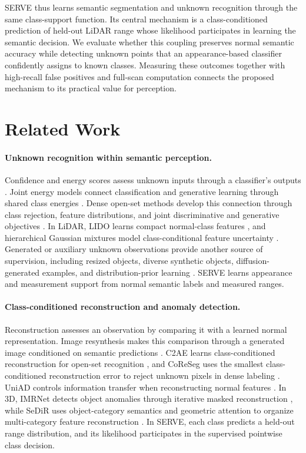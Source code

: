 \documentclass{article}
\begin{document}
SERVE thus learns semantic segmentation and unknown recognition through the same class-support function. Its central mechanism is a class-conditioned prediction of held-out LiDAR range whose likelihood participates in learning the semantic decision. We evaluate whether this coupling preserves normal semantic accuracy while detecting unknown points that an appearance-based classifier confidently assigns to known classes. Measuring these outcomes together with high-recall false positives and full-scan computation connects the proposed mechanism to its practical value for perception.

\section{Related Work}
\label{sec:related}
\paragraph{Unknown recognition within semantic perception.}
Confidence and energy scores assess unknown inputs through a classifier's outputs \citep{msp,energy}. Joint energy models connect classification and generative learning through shared class energies \citep{jem}. Dense open-set methods develop this connection through class rejection, feature distributions, and joint discriminative and generative objectives \citep{rba,pixood,densehybrid}. In LiDAR, LIDO learns compact normal-class features \citep{lido}, and hierarchical Gaussian mixtures model class-conditional feature uncertainty \citep{hgmm}. Generated or auxiliary unknown observations provide another source of supervision, including resized objects, diverse synthetic objects, diffusion-generated examples, and distribution-prior learning \citep{real,lion,doodle,ndp,rel}. SERVE learns appearance and measurement support from normal semantic labels and measured ranges.

\paragraph{Class-conditioned reconstruction and anomaly detection.}
Reconstruction assesses an observation by comparing it with a learned normal representation. Image resynthesis makes this comparison through a generated image conditioned on semantic predictions \citep{resynthesis}. C2AE learns class-conditioned reconstruction for open-set recognition \citep{c2ae}, and CoReSeg uses the smallest class-conditioned reconstruction error to reject unknown pixels in dense labeling \citep{coreseg}. UniAD controls information transfer when reconstructing normal features \citep{uniad}. In 3D, IMRNet detects object anomalies through iterative masked reconstruction \citep{imrnet}, while SeDiR uses object-category semantics and geometric attention to organize multi-category feature reconstruction \citep{sedir}. In SERVE, each class predicts a held-out range distribution, and its likelihood participates in the supervised pointwise class decision.
\end{document}
